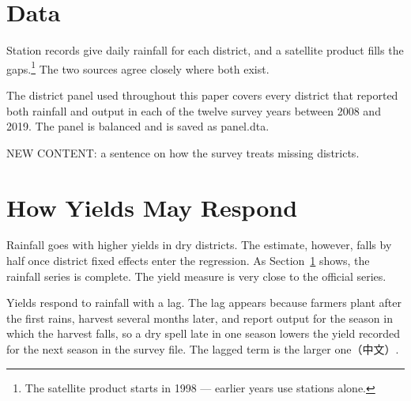 \documentclass{article}
\begin{document}
\section{Data}
\label{sec:data}

Station records give daily rainfall for each district, and a satellite product fills the gaps.\footnote{The satellite product starts in 1998 --- earlier years use stations alone.} The two sources agree closely where both exist.

The district panel used throughout this paper covers every district that reported both rainfall and output in each of the twelve survey years between 2008 and 2019.
The panel is balanced and is saved as panel.dta.

NEW CONTENT: a sentence on how the survey treats missing districts.

\section{How Yields May Respond}

Rainfall goes with higher yields in dry districts. The estimate, however, falls by half once district fixed effects enter the regression. As Section~\ref{sec:data} shows, the rainfall series is complete. The yield measure is very close to the official series.

Yields respond to rainfall with a lag. The lag appears because farmers plant after the first rains, harvest several months later, and report output for the season in which the harvest falls, so a dry spell late in one season lowers the yield recorded for the next season in the survey file. The lagged term is the larger one（中文）.
\end{document}
